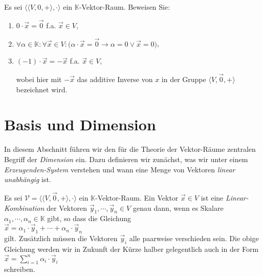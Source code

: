\exercise
Es sei $\bigl\langle \langle V, 0, +\rangle, \cdot\bigr\rangle$ ein $\mathbb{K}$-Vektor-Raum.  Beweisen Sie:
\renewcommand{\labelenumi}{(\alph{enumi})}
\begin{enumerate}
\item $0 \cdot \vec{x} = \vec{0}$ \quad f.a. $\vec{x} \in V$,
\item $\forall \alpha \in \mathbb{K}: \forall \vec{x} \in V: \bigl(\alpha \cdot \vec{x} = \vec{0} \rightarrow \alpha = 0 \vee \vec{x} = 0\bigr)$,
\item $(-1) \cdot \vec{x} = -\vec{x}$ \quad f.a. $\vec{x} \in V$,

      wobei hier mit $-\vec{x}$ das additive Inverse von $x$ in der Gruppe $\langle V, \vec{0}, +\rangle$
      bezeichnet wird. 
      \eoxs
\end{enumerate}
\renewcommand{\labelenumi}{\arabic{enumi}.}

\section{Basis und Dimension}
In diesem Abschnitt f\"{u}hren wir den f\"{u}r die Theorie der Vektor-R\"{a}ume zentralen Begriff der \emph{Dimension} 
ein.  Dazu definieren wir zun\"{a}chst, was wir unter einem \emph{Erzeugenden-System}
verstehen und wann eine Menge von Vektoren \emph{linear unabh\"{a}ngig} ist.

\begin{Definition}
Es sei $\mathcal{V} = \bigl\langle \langle V, \vec{0}, + \rangle, \cdot \bigr\rangle$ ein $\mathbb{K}$-Vektor-Raum.  Ein Vektor $\vec{x} \in V$ ist eine
\emph{Linear-Kombination} der Vektoren $\vec{y}_1, \cdots, \vec{y}_n \in V$ genau dann, wenn es Skalare
$\alpha_1, \cdots, \alpha_n \in \mathbb{K}$ gibt, so dass die Gleichung
\\[0.2cm]
\hspace*{1.3cm}
$\vec{x} = \alpha_1 \cdot \vec{y}_1 + \cdots + \alpha_n \cdot \vec{y}_n$
\\[0.2cm]
gilt.  Zus\"{a}tzlich m\"{u}ssen die Vektoren $\vec{y}_i$ alle paarweise verschieden sein.
Die obige Gleichung werden wir in Zukunft der K\"{u}rze halber gelegentlich auch in der Form
\\[0.2cm]
\hspace*{1.3cm}
$\vec{x} = \sum\limits_{i=1}^n \alpha_i \cdot \vec{y}_i$
\\[0.2cm]
schreiben.
\eoxs
\end{Definition}

